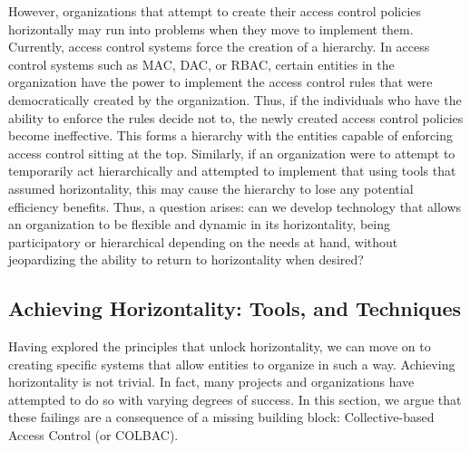 However, organizations that attempt to create their access control policies
horizontally may run into problems when they move to implement them. Currently,
access control systems force the creation of a hierarchy. In access control
systems such as MAC, DAC, or RBAC, certain entities in the organization have the
power to implement the access control rules that were democratically created by
the organization. Thus, if the individuals who have the ability to enforce the
rules decide not to, the newly created access control policies become
ineffective. This forms a hierarchy with the entities capable of enforcing
access control sitting at the top. Similarly, if an organization were to attempt
to temporarily act hierarchically and attempted to implement that using tools
that assumed horizontality, this may cause the hierarchy to lose any potential
efficiency benefits. Thus, a question arises: can we develop technology that
allows an organization to be flexible and dynamic in its horizontality, being
participatory or hierarchical depending on the needs at hand, without
jeopardizing the ability to return to horizontality when desired?

\subsection{Achieving Horizontality: Tools, and Techniques}
Having explored the principles that unlock horizontality, we can move on to
creating specific systems that allow entities to organize in such a way.
Achieving horizontality is not trivial. In fact, many projects and
organizations have attempted to do so with varying degrees of success. In this
section, we argue that these failings are a consequence of a missing building
block: Collective-based Access Control (or COLBAC).


